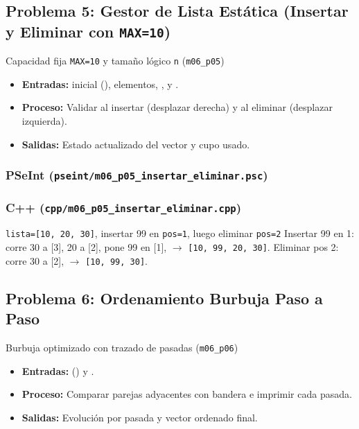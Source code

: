 \documentclass[11pt,letterpaper]{article}
\begin{document}
\subsection{Problema 5: Gestor de Lista Estática (Insertar y Eliminar con \texttt{MAX=10})}
\begin{analisis}{Capacidad fija \texttt{MAX=10} y tamaño lógico \texttt{n} (\texttt{m06\_p05})}
\begin{itemize}
  \item \textbf{Entradas:}  inicial (), elementos, ,  y .
  \item \textbf{Proceso:} Validar  al insertar (desplazar derecha) y  al eliminar (desplazar izquierda).
  \item \textbf{Salidas:} Estado actualizado del vector y cupo usado.
\end{itemize}
\end{analisis}

\subsubsection*{PSeInt (\texttt{pseint/m06\_p05\_insertar\_eliminar.psc})}


\subsubsection*{C++ (\texttt{cpp/m06\_p05\_insertar\_eliminar.cpp})}


\begin{pruebaescritorio}{\texttt{lista=[10, 20, 30]}, insertar 99 en \texttt{pos=1}, luego eliminar \texttt{pos=2}}
Insertar 99 en 1: corre 30 a [3], 20 a [2], pone 99 en [1],  $\rightarrow$ \texttt{[10, 99, 20, 30]}. Eliminar pos 2: corre 30 a [2],  $\rightarrow$ \texttt{[10, 99, 30]}.
\end{pruebaescritorio}

\subsection{Problema 6: Ordenamiento Burbuja Paso a Paso}
\begin{analisis}{Burbuja optimizado con trazado de pasadas (\texttt{m06\_p06})}
\begin{itemize}
  \item \textbf{Entradas:}  () y .
  \item \textbf{Proceso:} Comparar parejas adyacentes con bandera  e imprimir cada pasada.
  \item \textbf{Salidas:} Evolución por pasada y vector ordenado final.
\end{itemize}
\end{analisis}
\end{document}
